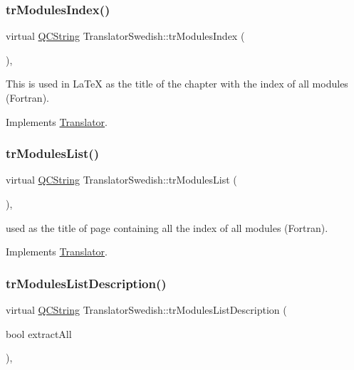 \subsubsection{\texorpdfstring{trModulesIndex()}{trModulesIndex()}}
{\footnotesize\ttfamily virtual \mbox{\hyperlink{class_q_c_string}{Q\+C\+String}} Translator\+Swedish\+::tr\+Modules\+Index (\begin{DoxyParamCaption}{ }\end{DoxyParamCaption})\hspace{0.3cm}{\ttfamily [inline]}, {\ttfamily [virtual]}}

This is used in La\+TeX as the title of the chapter with the index of all modules (Fortran). 

Implements \mbox{\hyperlink{class_translator}{Translator}}.

\mbox{\label{class_translator_swedish_aaf09aadbae667e08c08237332f8c4e6f}} 
\subsubsection{\texorpdfstring{trModulesList()}{trModulesList()}}
{\footnotesize\ttfamily virtual \mbox{\hyperlink{class_q_c_string}{Q\+C\+String}} Translator\+Swedish\+::tr\+Modules\+List (\begin{DoxyParamCaption}{ }\end{DoxyParamCaption})\hspace{0.3cm}{\ttfamily [inline]}, {\ttfamily [virtual]}}

used as the title of page containing all the index of all modules (Fortran). 

Implements \mbox{\hyperlink{class_translator}{Translator}}.

\mbox{\label{class_translator_swedish_a6ba4fb4c95d5ddaefb86d7bc451b3220}} 
\subsubsection{\texorpdfstring{trModulesListDescription()}{trModulesListDescription()}}
{\footnotesize\ttfamily virtual \mbox{\hyperlink{class_q_c_string}{Q\+C\+String}} Translator\+Swedish\+::tr\+Modules\+List\+Description (\begin{DoxyParamCaption}\item[{bool}]{extract\+All }\end{DoxyParamCaption})\hspace{0.3cm}{\ttfamily [inline]}, {\ttfamily [virtual]}}

